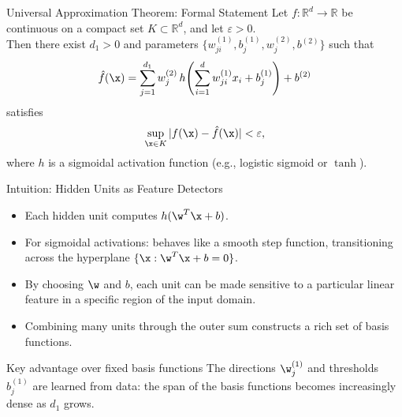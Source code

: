 \begin{frame}{Universal Approximation Theorem: Formal Statement}
  Let $f\colon\mathbb{R}^d\to\mathbb{R}$ be continuous on a compact set $K\subset\mathbb{R}^d$, and let $\varepsilon>0$.\\[0.5em]
  Then there exist $d_1>0$ and parameters $\{w_{ji}^{(1)}, b_j^{(1)}, w_j^{(2)}, b^{(2)}\}$ such that
  \[
    \hat f(\x) = \sum_{j=1}^{d_1} w_j^{(2)}\, h\!\left(\sum_{i=1}^{d} w_{ji}^{(1)} x_i + b_j^{(1)}\right) + b^{(2)}
  \]
  satisfies
  \[
    \sup_{\x\in K} |f(\x) - \hat f(\x)| < \varepsilon,
  \]
  where $h$ is a sigmoidal activation function (e.g., logistic sigmoid or $\tanh$).
\end{frame}

\begin{frame}{Intuition: Hidden Units as Feature Detectors}
  \begin{itemize}
    \item Each hidden unit computes $h(\w^T\x + b)$.
    \item For sigmoidal activations: behaves like a \alert{smooth step function}, transitioning across the hyperplane $\{\x : \w^T\x + b = 0\}$.
    \item By choosing $\w$ and $b$, each unit can be made sensitive to a \alert{particular linear feature} in a specific region of the input domain.
    \item Combining many units through the outer sum constructs a rich set of basis functions.
  \end{itemize}
  \begin{alertblock}{Key advantage over fixed basis functions}
    The directions $\w_j^{(1)}$ and thresholds $b_j^{(1)}$ are \alert{learned from data}: the span of
    the basis functions becomes increasingly dense as $d_1$ grows.
  \end{alertblock}
\end{frame}

